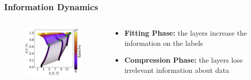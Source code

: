\documentclass[notes]{beamer}
\begin{document}
\begin{frame}
    \frametitle{Information Dynamics}
    \begin{columns}
        \begin{column}{0.5\textwidth}
            \begin{figure}
                \centering
                \includegraphics[width=6cm]{IB_information_plane.jpg}
            \end{figure}
        \end{column}
        \begin{column}{0.45\textwidth}
            \begin{itemize}
                \item \textbf{Fitting Phase:} the layers increase the information on the labels 
                \item \textbf{Compression Phase:} the layers lose irrelevant information about data 
            \end{itemize}
        \end{column}
    \end{columns}

\end{frame}
\end{document}
